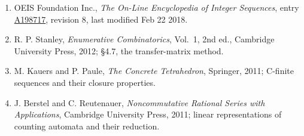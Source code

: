 \documentclass[11pt]{article}
\theoremstyle{definition}
\begin{document}
\begin{enumerate}

\item OEIS Foundation Inc., \emph{The On-Line Encyclopedia of Integer Sequences}, entry \href{https://oeis.org/A198717}{A198717}, revision 8, last modified Feb 22 2018.

\item R. P. Stanley, \emph{Enumerative Combinatorics}, Vol.~1, 2nd ed., Cambridge University Press, 2012; \S4.7, the transfer-matrix method.

\item M. Kauers and P. Paule, \emph{The Concrete Tetrahedron}, Springer, 2011; C-finite sequences and their closure properties.

\item J. Berstel and C. Reutenauer, \emph{Noncommutative Rational Series with Applications}, Cambridge University Press, 2011; linear representations of counting automata and their reduction.

\end{enumerate}
\end{document}

